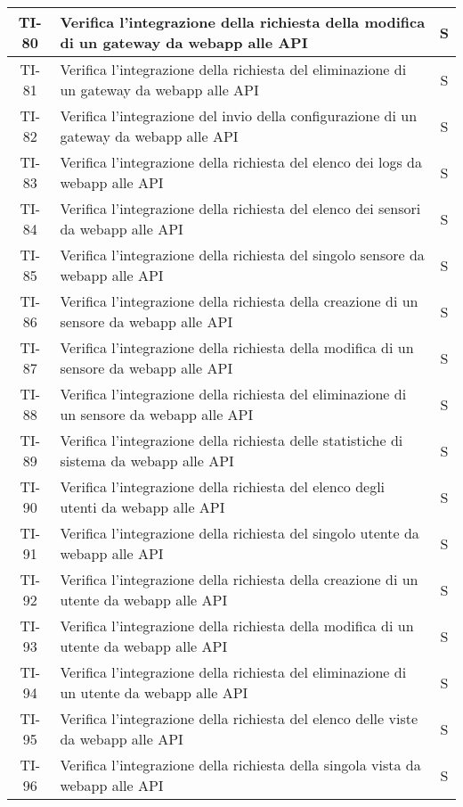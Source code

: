 \begin{center}
\begin{longtable}{|c|p{12cm}|c|}
			\hline
			TI-80 & Verifica l'integrazione della richiesta della modifica di un gateway da webapp alle API & S \\
			\hline
			TI-81 & Verifica l'integrazione della richiesta del eliminazione di un gateway da webapp alle API & S \\
			\hline
			TI-82 & Verifica l'integrazione del invio della configurazione di un gateway da webapp alle API & S \\
			\hline
			TI-83 & Verifica l'integrazione della richiesta del elenco dei logs da webapp alle API & S \\
			\hline
			TI-84 & Verifica l'integrazione della richiesta del elenco dei sensori da webapp alle API & S \\
			\hline
			TI-85 & Verifica l'integrazione della richiesta del singolo sensore da webapp alle API & S \\
			\hline
			TI-86 & Verifica l'integrazione della richiesta della creazione di un sensore da webapp alle API & S \\
			\hline
			TI-87 & Verifica l'integrazione della richiesta della modifica di un sensore da webapp alle API & S \\
			\hline
			TI-88 & Verifica l'integrazione della richiesta del eliminazione di un sensore da webapp alle API & S \\
			\hline
			TI-89 & Verifica l'integrazione della richiesta delle statistiche di sistema da webapp alle API & S \\
			\hline
			TI-90 & Verifica l'integrazione della richiesta del elenco degli utenti da webapp alle API & S \\
			\hline
			TI-91 & Verifica l'integrazione della richiesta del singolo utente da webapp alle API & S \\
			\hline
			TI-92 & Verifica l'integrazione della richiesta della creazione di un utente da webapp alle API & S \\
			\hline
			TI-93 & Verifica l'integrazione della richiesta della modifica di un utente da webapp alle API & S \\
			\hline
			TI-94 & Verifica l'integrazione della richiesta del eliminazione di un utente da webapp alle API & S \\
			\hline
			TI-95 & Verifica l'integrazione della richiesta del elenco delle viste da webapp alle API & S \\
			\hline
			TI-96 & Verifica l'integrazione della richiesta della singola vista da webapp alle API & S \\

\end{longtable}
\end{center}
